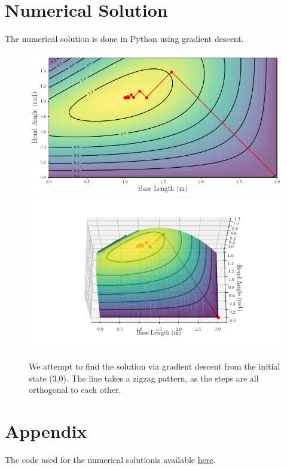 \documentclass{article}
\begin{document}
\section*{Numerical Solution}
The numerical solution is done in Python using gradient descent. 
\begin{figure}[h]
\includegraphics[scale = 0.43]{2dplotoptimized.png}
\includegraphics[trim = {3cm, 1cm, 3cm, 1.5cm}, clip, scale = 0.53]{3dplotoptimized.png}
\caption{We attempt to find the solution via gradient descent from the initial state (3,0). The line takes a zigzag pattern, as the steps are all orthogonal to each other. }
\end{figure}

\section*{Appendix}
The code used for the numerical solutionis available \href{https://github.com/thetruejacob/CS164/blob/master/Exact%20Line%20Search.ipynb}{here}.
\end{document}
